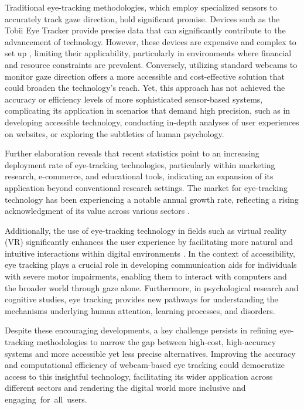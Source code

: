 \documentclass[conference]{IEEEtran}
\begin{document}
Traditional eye-tracking methodologies, which employ specialized sensors to accurately track gaze direction, hold significant promise. Devices such as the Tobii Eye Tracker\cite{tobii-eye-tracker} provide precise data that can significantly contribute to the advancement of technology. However, these devices are expensive and complex to set up \cite{tobii-eye-tracker}, limiting their applicability, particularly in environments where financial and resource constraints are prevalent. Conversely, utilizing standard webcams to monitor gaze direction offers a more accessible and cost-effective solution \cite{webcams-for-eyetracking} that could broaden the technology's reach. Yet, this approach has not achieved the accuracy or efficiency levels of more sophisticated sensor-based systems, complicating its application in scenarios that demand high precision, such as in developing accessible technology, conducting in-depth analyses of user experiences on websites, or exploring the subtleties of human psychology.

Further elaboration reveals that recent statistics point to an increasing deployment rate of eye-tracking technologies, particularly within marketing research, e-commerce, and educational tools, indicating an expansion of its application beyond conventional research settings. The market for eye-tracking technology has been experiencing a notable annual growth rate, reflecting a rising acknowledgment of its value across various sectors \cite{market-growth}.

Additionally, the use of eye-tracking technology in fields such as virtual reality (VR) significantly enhances the user experience by facilitating more natural and intuitive interactions within digital environments \cite{VR-eyetracking}. In the context of accessibility, eye tracking plays a crucial role in developing communication aids for individuals with severe motor impairments, enabling them to interact with computers and the broader world through gaze alone. Furthermore, in psychological research and cognitive studies, eye tracking provides new pathways for understanding the mechanisms underlying human attention, learning processes, and disorders.

Despite these encouraging developments, a key challenge persists in refining eye-tracking methodologies to narrow the gap between high-cost, high-accuracy systems and more accessible yet less precise alternatives. Improving the accuracy and computational efficiency of webcam-based eye tracking could democratize access to this insightful technology, facilitating its wider application across different sectors and rendering the digital world more inclusive and engaging for all users.
\end{document}
